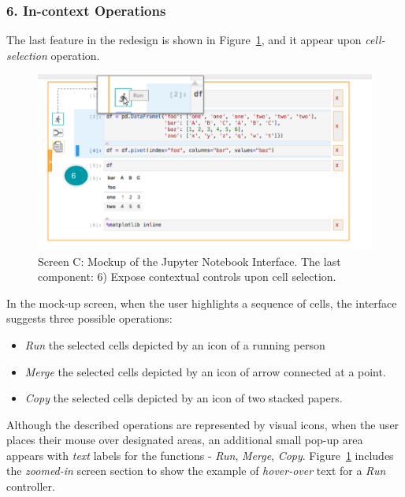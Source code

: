 \documentclass[12pt,letterpaper]{article}
\begin{document}
\subsubsection*{6. In-context Operations}
The last feature in the redesign is shown in Figure~\ref{fig::6}, and it appear upon \textit{cell-selection} operation. 

\begin{figure}[hbt!]
\centering
\includegraphics[scale=.35]{figures/project-principles/jupyter_mock_screen_c.png}
\caption{Screen C: Mockup of the Jupyter Notebook Interface. The last component: 6) Expose contextual controls upon cell selection.}
\label{fig::6}
\end{figure}

In the mock-up screen, when the user highlights a sequence of cells, the interface suggests three possible operations:

\begin{itemize}
\itemsep0em 
    \item \textit{Run} the selected cells depicted by an icon of a running person
    \item \textit{Merge} the selected cells depicted by an icon of arrow connected at a point.
    \item \textit{Copy} the selected cells depicted by an icon of two stacked papers.
\end{itemize}

Although the described operations are represented by visual icons, when the user places their mouse over designated areas, an additional small pop-up area appears with \textit{text} labels for the functions - \textit{Run}, \textit{Merge}, \textit{Copy}. Figure~\ref{fig::6} includes the \textit{zoomed-in} screen section to show the example of \textit{hover-over} text for a \textit{Run} controller.
\end{document}
